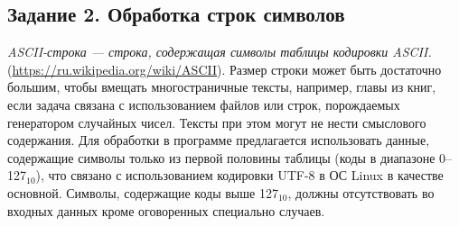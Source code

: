 \documentclass[a4paper, 12pt, oneside]{article}
\begin{document}
\begin{center}
\section*{Задание 2. Обработка строк символов}
\end{center}

\textit{ASCII-строка --- строка, содержащая символы таблицы кодировки ASCII.} (\url{https://ru.wikipedia.org/wiki/ASCII}). Размер строки может быть достаточно большим, чтобы вмещать многостраничные тексты, например, главы из книг, если задача связана с использованием файлов или строк, порождаемых генератором случайных чисел. Тексты при этом могут не нести смыслового содержания. Для обработки в программе предлагается использовать данные, содержащие символы только из первой половины таблицы (коды в диапазоне 0--127$_{10}$), что связано с использованием кодировки UTF-8 в ОС Linux в качестве основной. Символы, содержащие коды выше 127$_{10}$, должны отсутствовать во входных данных кроме оговоренных специально случаев.
\end{document}
